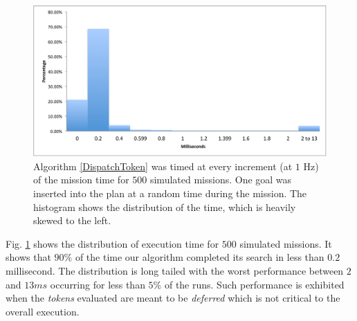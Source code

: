 \begin{figure}[!b]
  \centering
  \includegraphics[width=\columnwidth]{figs/HistogramAlg1}
  \caption{\small Algorithm \ref{DispatchToken} was timed at every
    increment (at $1$ Hz) of the mission time for $500$ simulated
    missions. One goal was inserted into the plan at a random time
    during the mission. The histogram shows the distribution of the
    time, which is heavily skewed to the left.}
  \label{fig:histogram}
\end{figure}

Fig. \ref{fig:histogram} shows the distribution of execution time for
$500$ simulated missions. It shows that $90\%$ of the time our
algorithm completed its search in less than $0.2$ millisecond. The
distribution is long tailed with the worst performance between $2$ and
$13ms$ occurring for less than $5\%$ of the runs. Such performance is
exhibited when the {\em tokens} evaluated are meant to be {\em
  deferred} which is not critical to the overall execution.



